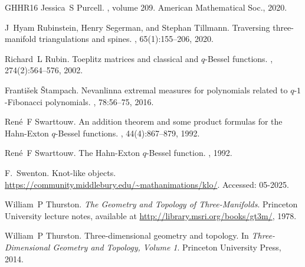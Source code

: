 \documentclass[11pt]{amsart}
\begin{document}
\begin{thebibliography}{GHHR16}
Jessica~S Purcell.
, volume 209.
\newblock American Mathematical Soc., 2020.

J~Hyam Rubinstein, Henry Segerman, and Stephan Tillmann.
\newblock Traversing three-manifold triangulations and spines.
, 65(1):155--206, 2020.

Richard~L Rubin.
\newblock Toeplitz matrices and classical and $q$-{B}essel functions.
,
  274(2):564--576, 2002.

Franti{\v{s}}ek {\v{S}}tampach.
\newblock Nevanlinna extremal measures for polynomials related to
  $q$-$1$-{F}ibonacci polynomials.
, 78:56--75, 2016.

Ren{\'e}~F Swarttouw.
\newblock An addition theorem and some product formulas for the {H}ahn-{E}xton
  $q$-{B}essel functions.
, 44(4):867--879, 1992.

Ren{\'e}~F Swarttouw.
\newblock The {H}ahn-{E}xton $q$-{B}essel function.
, 1992.

F.~Swenton.
\newblock Knot-like objects.
\newblock \url{https://community.middlebury.edu/~mathanimations/klo/}.
\newblock Accessed: 05-2025.

William~P Thurston.
\newblock \emph{The Geometry and Topology of Three-Manifolds}.
\newblock Princeton University lecture notes, available at
  \url{http://library.msri.org/books/gt3m/}, 1978.

William~P Thurston.
\newblock Three-dimensional geometry and topology.
\newblock In {\em Three-Dimensional Geometry and Topology, Volume 1}. Princeton
  University Press, 2014.

\end{thebibliography}
\end{document}
